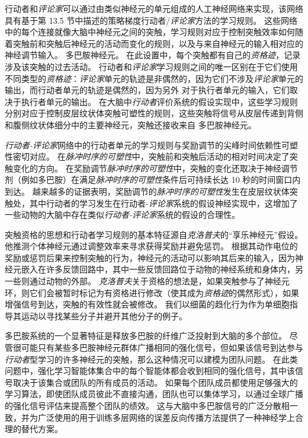 行动者和\textit{评论家}可以通过由类似神经元的单元组成的人工神经网络来实现，该网络具有基于第 13.5 节中描述的策略梯度行动者/\textit{评论家}方法的学习规则。
这些网络中的每个连接就像大脑中神经元之间的突触，学习规则对应于控制突触效率如何随着突触前和突触后神经元的活动而变化的规则，以及与来自神经元的输入相对应的神经调节输入。
多巴胺神经元。
在此设置中，每个突触都有自己的\textit{资格迹}，记录涉及该突触的过去活动。
行动者和\textit{评论家}学习规则之间的唯一区别在于它们使用不同类型的\textit{资格迹}：\textit{评论家}单元的轨迹是非偶然的，因为它们不涉及\textit{评论家}单元的输出，而行动者单元的轨迹是偶然的，因为另外 对于执行者单元的输入，它们取决于执行者单元的输出。
在大脑中\textit{行动者}评价系统的假设实现中，这些学习规则分别对应于控制皮层纹状体突触可塑性的规则，这些突触将信号从皮层传递到背侧和腹侧纹状体细分中的主要神经元，突触还接收来自 多巴胺神经元。


\textit{行动者-评论家}网络中的行动者单元的学习规则与奖励调节的尖峰时间依赖性可塑性密切对应。
在\textit{脉冲时序的可塑性}中，突触前和突触后活动的相对时间决定了突触变化的方向。
在奖励调节\textit{脉冲时序的可塑性}中，突触的变化还取决于神经调节剂（例如多巴胺）在满足\textit{脉冲时序的可塑性}条件后可持续长达 10 秒的时间窗口内到达。
越来越多的证据表明，奖励调节的\textit{脉冲时序的可塑性}发生在皮层纹状体突触处，其中行动者的学习发生在行动者-\textit{评论家}系统的假设神经实现中，这增加了一些动物的大脑中存在类似\textit{行动者-评论家}系统的假设的合理性。


突触资格的思想和行动者学习规则的基本特征源自\textit{克洛普夫}的“享乐神经元”假设\cite{klopf1972brain,klopf1982hedonistic}。
他推测个体神经元通过调整效率来寻求获得奖励并避免惩罚。
根据其动作电位的奖励或惩罚后果来控制突触的行为，神经元的活动可以影响其后来的输入，因为神经元嵌入在许多反馈回路中，其中一些反馈回路位于动物的神经系统和身体内，另一些则通过动物的外部。
\textit{克洛普夫}关于资格的想法是，如果突触参与了神经元环，则它们会被暂时标记为有资格进行修改（使其成为\textit{资格迹}的偶然形式），如果增强信号到达，突触的有效性就会被修改。
我们以细菌的趋化行为作为单细胞指导其运动以寻找某些分子并避开其他分子的例子。


多巴胺系统的一个显著特征是释放多巴胺的纤维广泛投射到大脑的多个部位。
尽管很可能只有某些多巴胺神经元群体广播相同的强化信号，但如果该信号到达参与\textit{行动者}型学习的许多神经元的突触，那么这种情况可以建模为团队问题。
在此类问题中，强化学习智能体集合中的每个智能体都会收到相同的强化信号，其中该信号取决于该集合或团队的所有成员的活动。
如果每个团队成员都使用足够强大的学习算法，即使团队成员彼此不直接沟通，团队也可以集体学习，以通过全球广播的强化信号评估来提高整个团队的绩效。
这与大脑中多巴胺信号的广泛分散相一致，并为广泛使用的用于训练多层网络的误差反向传播方法提供了一种神经学上合理的替代方案。


